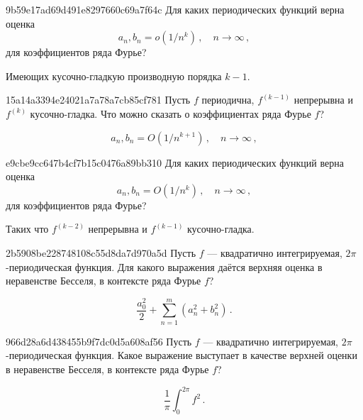 \begin{note}{9b59e17ad69d491e8297660c69a7f64c}
    Для каких периодических функций верна оценка
    \[
        a_n, b_n = o(1 / n^k)\,, \quad n \to \infty\,,
    \]
    для коэффициентов ряда Фурье?

    \begin{cloze}{1}
        Имеющих кусочно-гладкую производную порядка \({ k-1 }\).
    \end{cloze}
\end{note}

\begin{note}{15a14a3394e24021a7a78a7cb85cf781}
    Пусть \({ f }\) периодична, \({ f^{(k-1)} }\) непрерывна и \({ f^{(k)} }\) кусочно-гладка.
    Что можно сказать о коэффициентах ряда Фурье \({ f }\)?

    \begin{cloze}{1}
        \[
            a_n, b_n = O(1 / n^{k+1})\,, \quad n \to \infty\,,
        \]
    \end{cloze}
\end{note}

\begin{note}{e9cbe9cc647b4cf7b15c0476a89bb310}
    Для каких периодических функций верна оценка
    \[
        a_n, b_n = O(1 /n^k)\,, \quad n \to \infty\,,
    \]
    для коэффициентов ряда Фурье?

    \begin{cloze}{1}
        Таких что \({ f^{(k-2)} }\) непрерывна и \({ f^{(k-1)} }\) кусочно-гладка.
    \end{cloze}
\end{note}

\begin{note}{2b5908be228748108c55d8da7d970a5d}
    Пусть \({ f }\) --- квадратично интегрируемая, \({ 2\pi }\)-периодическая функция.
    Для какого выражения даётся верхняя оценка в неравенстве Бесселя, в контексте ряда Фурье \({ f }\)?

    \begin{cloze}{1}
        \[
            \frac{a_0^2}{2} + \sum_{n=1}^{m}  (a_n^2 + b_n^2)\,.
        \]
    \end{cloze}
\end{note}

\begin{note}{966d28a6d438455b9f7dc0d5a608af56}
    Пусть \({ f }\) --- квадратично интегрируемая, \({ 2\pi }\)-периодическая функция.
    Какое выражение выступает в качестве верхней оценки в неравенстве Бесселя, в контексте ряда Фурье \({ f }\)?

    \begin{cloze}{1}
        \[
            \frac{1}{\pi} \int_{0}^{2\pi} f^2\,.
        \]
    \end{cloze}
\end{note}

